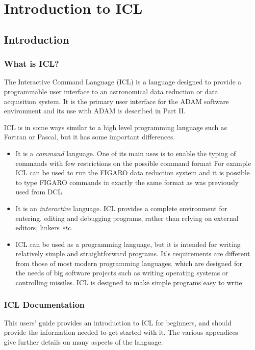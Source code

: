 \documentclass[twoside,11pt,nolof,chapters]{starlink}
\begin{document}
\scfrontmatter

   \part{Introduction to ICL}
   
   \chapter{Introduction}
   \section{What is ICL?}
The Interactive Command Language (ICL) is a language designed to provide
a programmable user interface to an astronomical data reduction or data
acquisition system.
It is the primary user interface for the ADAM software environment and its use
with ADAM is described in Part II.

ICL is in some ways similar to a high level programming
language such as Fortran or Pascal, but it has some important differences.
   \begin{itemize}
   \item It is a \emph{command} language. One of its main uses is to enable
the typing of commands with few restrictions on the possible command format
For example ICL can be used to run the FIGARO data reduction system and
it is possible to type FIGARO commands in
exactly the same format as was previously used from DCL.
   \item It is an \emph{interactive} language. ICL provides a complete
environment for entering, editing and debugging programs, rather than
relying on external editors, linkers \emph{etc.}
   \item ICL can be used as a programming language, but it is
intended for writing relatively simple and straightforward programs.
It's requirements are different from those of most modern programming languages,
which are designed for the needs of big software projects such as writing
operating systems or controlling missiles. ICL is designed to make simple
programs easy to write.
   \end{itemize}
   \section{ICL Documentation}
This users' guide provides
an introduction to ICL for beginners, and should provide the information
needed to get started with it. The various appendices give further details
on many aspects of the language.
\end{document}
